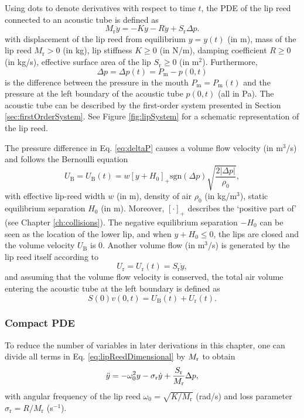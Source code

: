 Using dots to denote derivatives with respect to time $t$, the PDE of the lip reed connected to an acoustic tube is defined as
\begin{equation}\label{eq:lipReedDimensional}
    M_\text{r}\ddot y = -K y - R \dot y + S_\text{r}\Delta p.
\end{equation}
with displacement of the lip reed from equilibrium $y = y(t)$ (in m), mass of the lip reed $M_\text{r} > 0$ (in kg), lip stiffness $K\geq 0$ (in N/m), damping coefficient $R\geq 0$ (in kg/s), effective surface area of the lip $S_\text{r}\geq 0$ (in m$^2$). Furthermore,  
\begin{equation}\label{eq:deltaP}
    \Delta p = \Delta p(t) = P_\text{m} - p(0,t)
\end{equation}
is the difference between the pressure in the mouth $P_\text{m} = P_\text{m}(t)$ and the pressure at the left boundary of the acoustic tube $p(0,t)$ (all in Pa). The acoustic tube can be described by the first-order system presented in Section \ref{sec:firstOrderSystem}. See Figure \ref{fig:lipSystem} for a schematic representation of the lip reed.


The pressure difference in Eq. \eqref{eq:deltaP} causes a volume flow velocity (in  m$^3$/s) and follows the Bernoulli equation
\begin{equation}
    U_\text{B} = U_\text{B}(t) = w[y + H_0]_+\text{sgn}(\Delta p) \sqrt{\frac{2|\Delta p|}{\rho_0}},
\end{equation}
with effective lip-reed width $w$ (in m), density of air $\rho_0$ (in kg/m$^3$), static equilibrium separation $H_0$ (in m). Moreover, $[\cdot]_+$ describes the `positive part of' (see Chapter \ref{ch:collisions}). The negative equilibrium separation $-H_0$ can be seen as the location of the lower lip, and when $y + H_0 \leq 0$, the lips are closed and the volume velocity $U_\text{B}$ is 0.  Another volume flow (in m$^3$/s) is generated by the lip reed itself according to
\begin{equation}
    U_\text{r} = U_\text{r}(t) = S_\text{r} \dot y,
\end{equation}
and assuming that the volume flow velocity is conserved, the total air volume entering the acoustic tube at the left boundary is defined as
\begin{equation}
    S(0)v(0,t) = U_\text{B}(t) + U_\text{r}(t).
\end{equation} 

\subsubsection{Compact PDE}
To reduce the number of variables in later derivations in this chapter, one can divide all terms in Eq. \eqref{eq:lipReedDimensional} by $M_{\text{r}}$ to obtain
\begin{equation}
    \ddot y = -\omega_0^2 y - \sigma_\text{r} \dot y + \frac{S_\text{r}}{M_{\text{r}}}\Delta p,
\end{equation}
with angular frequency of the lip reed $\omega_0 = \sqrt{K/M_\text{r}}$ (rad/s) and loss parameter $\sigma_\text{r} = R / M_\text{r}$ (s$^{-1}$). 

